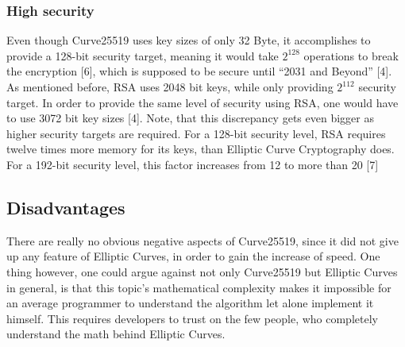 \subsubsection{High security}
Even though Curve25519 uses key sizes of only 32 Byte, it accomplishes to provide a 128-bit security target, meaning it would take $ 2^{128} $ operations to break the encryption [6], which is supposed to be secure until “2031 and Beyond” [4]. As mentioned before, RSA uses 2048 bit keys, while only providing $ 2^{112} $ security target. In order to provide the same level of security using RSA, one would have to use 3072 bit key sizes [4]. Note, that this discrepancy gets even bigger as higher security targets are required. For a 128-bit security level, RSA requires twelve times more memory for its keys, than Elliptic Curve Cryptography does. For a 192-bit security level, this factor increases from 12 to more than 20 [7]

\subsection{Disadvantages}
There are really no obvious negative aspects of Curve25519, since it did not give up any feature of Elliptic Curves, in order to gain the increase of speed. One thing however, one could argue against not only Curve25519 but Elliptic Curves in general, is that this topic’s mathematical complexity makes it impossible for an average programmer to understand the algorithm let alone implement it himself. This requires developers to trust on the few people, who completely understand the math behind Elliptic Curves.

